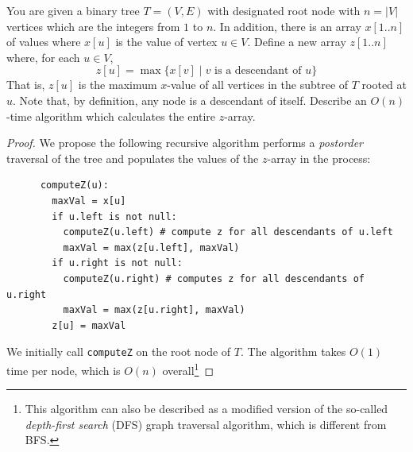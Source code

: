   \begin{exercise}[DPV 3.19]
    You are given a binary tree $T = (V, E)$ with designated root node with $n = |V|$ vertices which are the integers from $1$ to $n$. In addition, there is an array $x[1..n]$ of values where $x[u]$ is the value of vertex $u \in V$. Define a new array $z[1..n]$ where, for each $u \in V$,	
    \begin{equation}
      z[u] = \max \{ x[v] \mid \text{$v$ is a descendant of $u$}\}
    \end{equation}
    That is, $z[u]$ is the maximum $x$-value of all vertices in the subtree of $T$ rooted at $u$. Note that, by definition, any node is a descendant of itself. Describe an $O(n)$-time algorithm which calculates the entire $z$-array.
  \end{exercise}
  \begin{proof}
    We propose the following recursive algorithm performs a \emph{postorder} traversal of the tree and populates the values of the $z$-array in the process:
    \begin{lstlisting}
      computeZ(u):
        maxVal = x[u]
        if u.left is not null:
          computeZ(u.left) # compute z for all descendants of u.left
          maxVal = max(z[u.left], maxVal)
        if u.right is not null:
          computeZ(u.right) # computes z for all descendants of u.right
          maxVal = max(z[u.right], maxVal)
        z[u] = maxVal
    \end{lstlisting}
    We initially call \texttt{computeZ} on the root node of $T$.        The algorithm takes $O(1)$ time per node, which is $O(n)$ overall\footnote{This algorithm can also be described as a modified version of the so-called \emph{depth-first search} (DFS) graph traversal algorithm, which is different from BFS.}
  \end{proof}


